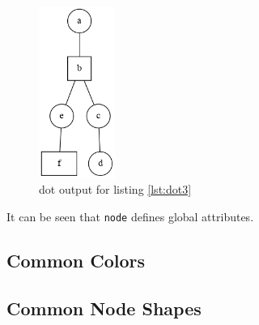 \documentclass{article}
\begin{document}
	

	\begin{figure}[H]
		\begin{center}
			\includegraphics[width=25mm]{figure3.png}
		\end{center}
		\caption{dot output for listing \ref{lst:dot3} }
		\label{fig:png3}
	\end{figure}

	It can be seen that \lstinline{node} defines global attributes.

	\subsection{Common Colors}

	\subsection{Common Node Shapes}
\end{document}

